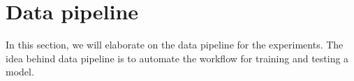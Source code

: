 \section{Data pipeline}
In this section, we will elaborate on the data pipeline for the experiments. The idea behind data pipeline is to automate the workflow for training and testing a model. 